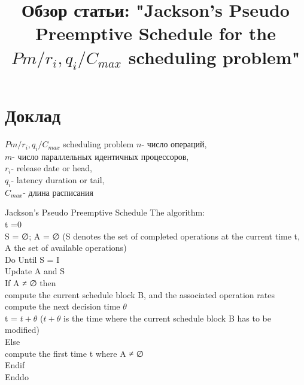 \documentclass{beamer}
\title[Your Short Title]{Обзор статьи: "Jackson’s Pseudo Preemptive Schedule for the $Pm/r_i , q_i/C_{max}$ scheduling problem"}
\institute{ }
\author{}
\date{ }
\begin{document}
\begin{frame}
  \titlepage
\end{frame}

\section{Доклад}


% 
%
%
\begin{frame}{$Pm/r_i , q_i/C_{max}$ scheduling problem}
    $n$- число операций,\\
    $m$- число параллельных идентичных процессоров,\\
    $r_i$- release date or head,\\
    $q_i$- latency duration or tail,\\
    $C_{max}$- длина расписания
    
    
\end{frame}

% 
\begin{frame}{Jackson’s Pseudo Preemptive Schedule
}
   The algorithm:\\
t =0\\
S = ∅; A = ∅ (S denotes the set of completed operations at the current time t, A the
set of available operations)\\
Do Until S = I\\
Update A and S\\ If A ≠ ∅ then\\
compute the current schedule block B, and the associated operation rates compute the next decision time $\theta$\\
t = $t + \theta$ ($t + \theta$ is the time where the current schedule block B has to be modified)\\
Else\\
compute the first time t where A ≠ ∅\\
Endif\\ Enddo
    
\end{frame}
\end{document}
